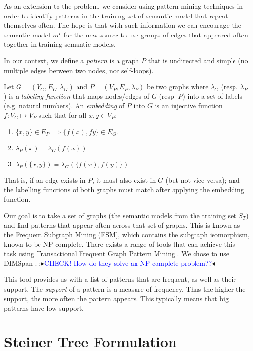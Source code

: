 \documentclass[letterpaper]{article} %
\newcommand{\authornote}[3]{
  {\fbox{\sc 
  #1}:$\blacktriangleright$\textcolor{#2}{\small{#3}}$\blacktriangleleft$}%
}
\newcommand{\ddg}[1]{\authornote{DDG}{blue}{#1}}
\begin{document}
As an extension to the problem, we consider using pattern mining techniques in 
order to identify patterns in the training set of semantic model that repeat 
themselves often. The hope is that with such information we can encourage the 
semantic model $m^\star$ for the new source to use groups of edges that 
appeared often together in training semantic models.

In our context, we define a \emph{pattern} is a graph $P$ that is undirected 
and simple (no multiple edges between two nodes, nor self-loops).

Let $G = (V_G,E_G,\lambda_G)$ and $P = (V_P,E_P, \lambda_P)$ be two graphs 
where $\lambda_G$ (resp. $\lambda_P$) is a \emph{labeling function} that maps 
nodes/edges of $G$ (resp. $P$) into a set of labels (e.g. natural numbers).
An \emph{embedding} of $P$ into $G$ is an injective function $f : V_G \mapsto 
V_P$ such that for all $x,y \in V_P$:
\begin{enumerate}
	\item $\{x,y\} \in E_P \implies \{f(x),f{y}\} \in E_G$.
	\item $\lambda_P(x) = \lambda_G(f(x))$
	\item $\lambda_P(\{x,y\}) = \lambda_G(\{f(x),f(y)\})$
\end{enumerate} 
That is, if an edge exists in $P$, it must also exist in $G$ (but not 
vice-versa); and the labelling functions of both graphs must match after 
applying the embedding function.

Our goal is to take a set of graphs (the semantic models from the training set 
$S_T$) and find patterns that appear often across that set of graphs. This is 
known as the Frequent Subgraph Mining (FSM), which contains the subgraph 
isomorphism, known to be NP-complete. 
There exists a range of tools that can achieve this task using Transactional 
Frequent Graph Pattern Mining
\cite{petermann2017dimspan,yan2002gspan}. We chose to use DIMSpan 
\cite{petermann2017dimspan}. \ddg{CHECK! How do they solve an NP-complete 
problem??}

This tool provides us with a list of patterns that are frequent, as well as 
their support. The \emph{support} of a pattern is a measure of frequency. Thus 
the higher the support, the more often the pattern appears. This typically 
means that big patterns have low support.

 

\section{Steiner Tree Formulation}
\end{document}
